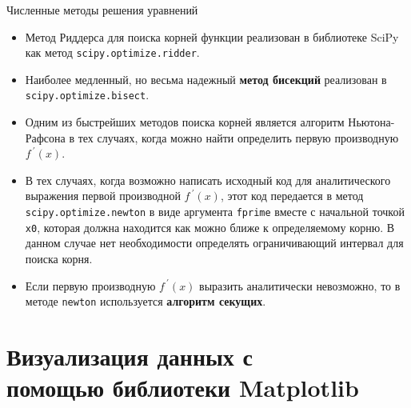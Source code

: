 \documentclass[aspectratio=169, mathserif]{beamer}	%
\begin{document}
\begin{frame}[fragile, label=c]{Численные методы решения уравнений}
\scriptsize
\begin{itemize}
\item Метод Риддерса для поиска корней функции реализован в библиотеке SciPy как метод \texttt{scipy.optimize.ridder}.
\item Наиболее медленный, но весьма надежный \textcolor{tpugreen}{\textbf{метод бисекций}} реализован в \texttt{scipy.optimize.bisect}.
\item Одним из быстрейших методов поиска корней является алгоритм Ньютона-Рафсона в тех случаях, когда можно найти определить первую производную $f^{\ \prime}(x)$.
\item В тех случаях, когда возможно написать исходный код для аналитического выражения первой производной $f^{\ \prime}(x)$, этот код передается в метод \texttt{scipy.optimize.newton} в виде аргумента \texttt{fprime} вместе с начальной точкой \texttt{x0}, которая должна находится как можно ближе к определяемому корню. В данном случае нет необходимости определять ограничивающий интервал для поиска корня.
\item Если первую производную $f^{\ \prime}(x)$ выразить аналитически невозможно, то в методе \texttt{newton} используется \textcolor{extraorange}{\textbf{алгоритм секущих}}.
\end{itemize}
\vfill
\end{frame}


\section{Визуализация данных с \\ помощью библиотеки Matplotlib}
\sectionframe
\end{document}
